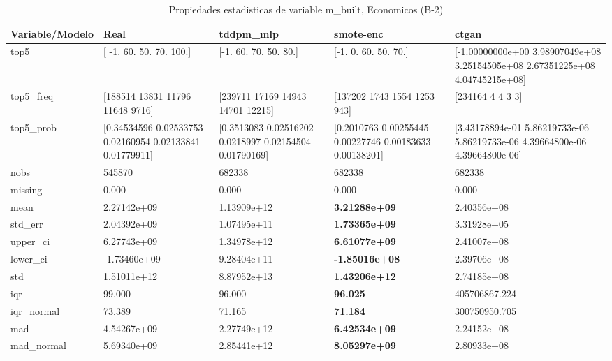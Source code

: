\begin{table}[H]
\centering
\fontsize{8}{14}\selectfont
\caption{Propiedades  estadisticas de variable m\_built, Economicos (B-2)}
\label{table-stats-economicos-b-2-m_built}
\begin{tabular}{|l|m{10em}|m{10em}|m{10em}|m{10em}|}
\hline
 \rowcolor[gray]{0.8}
Variable/Modelo & Real & tddpm\_mlp & smote-enc & ctgan \\
\hline top5 & [ -1.  60.  50.  70. 100.] & [-1. 60. 70. 50. 80.] & [-1.  0. 60. 50. 70.] & [-1.00000000e+00  3.98907049e+08  3.25154505e+08  2.67351225e+08
  4.04745215e+08] \\
\hline top5\_freq & [188514  13831  11796  11648   9716] & [239711  17169  14943  14701  12215] & [137202   1743   1554   1253    943] & [234164      4      4      3      3] \\
\hline top5\_prob & [0.34534596 0.02533753 0.02160954 0.02133841 0.01779911] & [0.3513083  0.02516202 0.0218997  0.02154504 0.01790169] & [0.2010763  0.00255445 0.00227746 0.00183633 0.00138201] & [3.43178894e-01 5.86219733e-06 5.86219733e-06 4.39664800e-06
 4.39664800e-06] \\
\hline nobs & 545870 & 682338 & 682338 & 682338 \\
\hline missing & 0.000 & 0.000 & 0.000 & 0.000 \\
\hline mean & 2.27142e+09 & \cellcolor[rgb]{0.9, 0.54, 0.52} 1.13909e+12 & \bfseries 3.21288e+09 & 2.40356e+08 \\
\hline std\_err & 2.04392e+09 & \cellcolor[rgb]{0.9, 0.54, 0.52} 1.07495e+11 & \bfseries 1.73365e+09 & 3.31928e+05 \\
\hline upper\_ci & 6.27743e+09 & \cellcolor[rgb]{0.9, 0.54, 0.52} 1.34978e+12 & \bfseries 6.61077e+09 & 2.41007e+08 \\
\hline lower\_ci & -1.73460e+09 & \cellcolor[rgb]{0.9, 0.54, 0.52} 9.28404e+11 & \bfseries -1.85016e+08 & 2.39706e+08 \\
\hline std & 1.51011e+12 & \cellcolor[rgb]{0.9, 0.54, 0.52} 8.87952e+13 & \bfseries 1.43206e+12 & 2.74185e+08 \\
\hline iqr & 99.000 & 96.000 & \bfseries 96.025 & \cellcolor[rgb]{0.9, 0.54, 0.52} 405706867.224 \\
\hline iqr\_normal & 73.389 & 71.165 & \bfseries 71.184 & \cellcolor[rgb]{0.9, 0.54, 0.52} 300750950.705 \\
\hline mad & 4.54267e+09 & \cellcolor[rgb]{0.9, 0.54, 0.52} 2.27749e+12 & \bfseries 6.42534e+09 & 2.24152e+08 \\
\hline mad\_normal & 5.69340e+09 & \cellcolor[rgb]{0.9, 0.54, 0.52} 2.85441e+12 & \bfseries 8.05297e+09 & 2.80933e+08 \\

\end{tabular}
\end{table}
